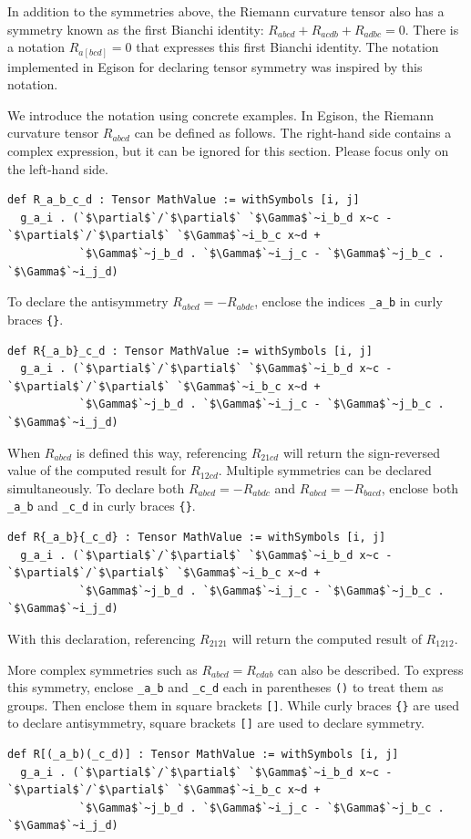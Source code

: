 In addition to the symmetries above, the Riemann curvature tensor also has a symmetry known as the first Bianchi identity: $R_{abcd} + R_{acdb} + R_{adbc} = 0$.
There is a notation $R_{a[bcd]} = 0$ that expresses this first Bianchi identity.
The notation implemented in Egison for declaring tensor symmetry was inspired by this notation.

We introduce the notation using concrete examples.
In Egison, the Riemann curvature tensor $R_{abcd}$ can be defined as follows.
The right-hand side contains a complex expression, but it can be ignored for this section.
Please focus only on the left-hand side.
\begin{lstlisting}[language=egison,numbers=none]
def R_a_b_c_d : Tensor MathValue := withSymbols [i, j]
  g_a_i . (`$\partial$`/`$\partial$` `$\Gamma$`~i_b_d x~c - `$\partial$`/`$\partial$` `$\Gamma$`~i_b_c x~d +
           `$\Gamma$`~j_b_d . `$\Gamma$`~i_j_c - `$\Gamma$`~j_b_c . `$\Gamma$`~i_j_d)
\end{lstlisting}
To declare the antisymmetry $R_{abcd} = -R_{abdc}$, enclose the indices \lstinline{_a_b} in curly braces \lstinline|{}|.
\begin{lstlisting}[language=egison,numbers=none]
def R{_a_b}_c_d : Tensor MathValue := withSymbols [i, j]
  g_a_i . (`$\partial$`/`$\partial$` `$\Gamma$`~i_b_d x~c - `$\partial$`/`$\partial$` `$\Gamma$`~i_b_c x~d +
           `$\Gamma$`~j_b_d . `$\Gamma$`~i_j_c - `$\Gamma$`~j_b_c . `$\Gamma$`~i_j_d)
\end{lstlisting}
When $R_{abcd}$ is defined this way, referencing $R_{21cd}$ will return the sign-reversed value of the computed result for $R_{12cd}$.
Multiple symmetries can be declared simultaneously.
To declare both $R_{abcd} = -R_{abdc}$ and $R_{abcd} = -R_{bacd}$, enclose both \lstinline{_a_b} and \lstinline{_c_d} in curly braces \lstinline|{}|.
\begin{lstlisting}[language=egison,numbers=none]
def R{_a_b}{_c_d} : Tensor MathValue := withSymbols [i, j]
  g_a_i . (`$\partial$`/`$\partial$` `$\Gamma$`~i_b_d x~c - `$\partial$`/`$\partial$` `$\Gamma$`~i_b_c x~d +
           `$\Gamma$`~j_b_d . `$\Gamma$`~i_j_c - `$\Gamma$`~j_b_c . `$\Gamma$`~i_j_d)
\end{lstlisting}
With this declaration, referencing $R_{2121}$ will return the computed result of $R_{1212}$.

More complex symmetries such as $R_{abcd} = R_{cdab}$ can also be described.
To express this symmetry, enclose \lstinline{_a_b} and \lstinline{_c_d} each in parentheses \lstinline{()} to treat them as groups.
Then enclose them in square brackets \lstinline|[]|.
While curly braces \lstinline|{}| are used to declare antisymmetry, square brackets \lstinline|[]| are used to declare symmetry.
\begin{lstlisting}[language=egison,numbers=none]
def R[(_a_b)(_c_d)] : Tensor MathValue := withSymbols [i, j]
  g_a_i . (`$\partial$`/`$\partial$` `$\Gamma$`~i_b_d x~c - `$\partial$`/`$\partial$` `$\Gamma$`~i_b_c x~d +
           `$\Gamma$`~j_b_d . `$\Gamma$`~i_j_c - `$\Gamma$`~j_b_c . `$\Gamma$`~i_j_d)
\end{lstlisting}

